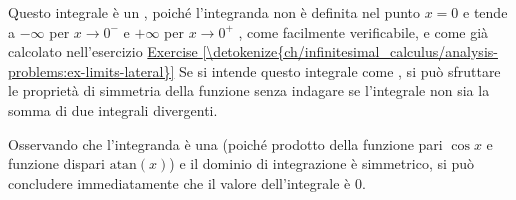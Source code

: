 \documentclass[letterpaper,10pt,italian]{jupyterBook}
\begin{document}
\sphinxAtStartPar
{}
\sphinxstylestrong{!!!} Questo integrale è un {\hyperref[\detokenize{ch/infinitesimal_calculus/integrals:infinitesimal-calculus-integrals-improper}]{}}, poiché l’integranda non è definita nel punto \(x=0\) e tende a \(-\infty\) per \(x \rightarrow 0^-\) e \(+\infty\) per \(x \rightarrow 0^+\) , come facilmente verificabile, e come già calcolato nell’esercizio \hyperref[\detokenize{ch/infinitesimal_calculus/analysis-problems:ex-limits-lateral}]{Exercise \ref{\detokenize{ch/infinitesimal_calculus/analysis-problems:ex-limits-lateral}}}  Se si intende questo integrale come {\hyperref[\detokenize{ch/infinitesimal_calculus/integrals:infinitesimal-calculus-integrals-improper-cauchy}]{}}, si può sfruttare le proprietà di simmetria della funzione senza indagare se l’integrale non sia la somma di due integrali divergenti.

\sphinxAtStartPar
Osservando che l’integranda è una {\hyperref[\detokenize{ch/precalculus/real-functions:math-hs-precalculus-real-functions-types}]{}} (poiché prodotto della funzione pari \(\cos x\) e funzione dispari \(\text{atan}(x)\)) e il dominio di integrazione è simmetrico, si può concludere immediatamente che il valore dell’integrale è \(0\).
\end{document}
